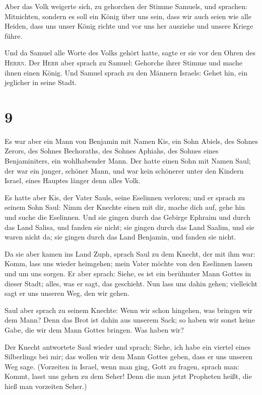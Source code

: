  Aber das Volk weigerte sich, zu gehorchen der Stimme
Samuels, und sprachen: Mitnichten, sondern es soll ein König über uns
sein,  dass wir auch seien wie alle Heiden, dass uns
unser König richte und vor uns her ausziehe und unsere Kriege führe.

 Und da Samuel alle Worte des Volks gehört hatte, sagte
er sie vor den Ohren des \textsc{Herrn}.  Der
\textsc{Herr} aber sprach zu Samuel: Gehorche ihrer Stimme und mache
ihnen einen König. Und Samuel sprach zu den Männern Israels: Gehet hin,
ein jeglicher in seine Stadt.

\hypertarget{section-8}{%
\section{9}\label{section-8}}

 Es war aber ein Mann von Benjamin mit Namen Kis, ein Sohn
Abiels, des Sohnes Zerors, des Sohnes Bechoraths, des Sohnes Aphiahs,
des Sohnes eines Benjaminiters, ein wohlhabender Mann. 
Der hatte einen Sohn mit Namen Saul; der war ein junger, schöner Mann,
und war kein schönerer unter den Kindern Israel, eines Hauptes länger
denn alles Volk.

 Es hatte aber Kis, der Vater Sauls, seine Eselinnen
verloren; und er sprach zu seinem Sohn Saul: Nimm der Knechte einen mit
dir, mache dich auf, gehe hin und suche die Eselinnen. 
Und sie gingen durch das Gebirge Ephraim und durch das Land Salisa, und
fanden sie nicht; sie gingen durch das Land Saalim, und sie waren nicht
da; sie gingen durch das Land Benjamin, und fanden sie nicht.

 Da sie aber kamen ins Land Zuph, sprach Saul zu dem
Knecht, der mit ihm war: Komm, lass uns wieder heimgehen; mein Vater
möchte von den Eselinnen lassen und um uns sorgen.  Er
aber sprach: Siehe, es ist ein berühmter Mann Gottes in dieser Stadt;
alles, was er sagt, das geschieht. Nun lass uns dahin gehen; vielleicht
sagt er uns unseren Weg, den wir gehen.

 Saul aber sprach zu seinem Knechte: Wenn wir schon
hingehen, was bringen wir dem Mann? Denn das Brot ist dahin aus unserem
Sack; so haben wir sonst keine Gabe, die wir dem Mann Gottes bringen.
Was haben wir?

 Der Knecht antwortete Saul wieder und sprach: Siehe, ich
habe ein viertel eines Silberlings bei mir; das wollen wir dem Mann
Gottes geben, dass er uns unseren Weg sage.  (Vorzeiten in
Israel, wenn man ging, Gott zu fragen, sprach man: Kommt, lasst uns
gehen zu dem Seher! Denn die man jetzt Propheten heißt, die hieß man
vorzeiten Seher.)

